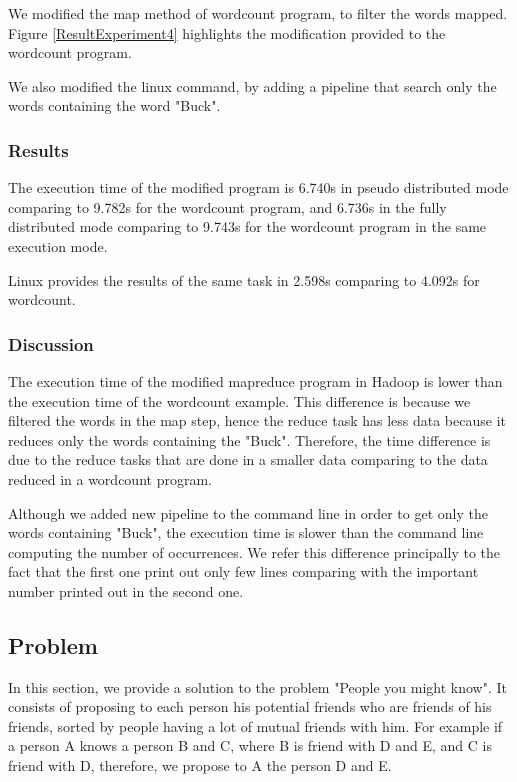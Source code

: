 \documentclass[10pt, conference]{IEEEtran}
\begin{document}
We modified the map method of wordcount program, to filter the words mapped. Figure \ref{ResultExperiment4} highlights the modification provided to the wordcount program.

We also modified the linux command, by adding a pipeline that search only the words containing the word "Buck".

\subsubsection{Results}
The execution time of the modified program is 6.740s in pseudo distributed mode comparing to 9.782s for the wordcount program, and 6.736s in the fully distributed mode comparing to 9.743s for the wordcount program in the same execution mode. 

Linux provides the results of the same task in 2.598s comparing to 4.092s for wordcount. 

\subsubsection{Discussion}

The execution time of the modified mapreduce program in Hadoop is lower than the execution time of the wordcount example. This difference is because we filtered the words in the map step, hence the reduce task has less data because it reduces only the words containing the "Buck". Therefore, the time difference is due to the reduce tasks that are done in a smaller data comparing to the data reduced in a wordcount program.

Although we added new pipeline to the command line in order to get only the words containing "Buck", the execution time is slower than the command line computing the number of occurrences. We refer this difference principally to the fact that the first one print out only few lines comparing with the important number printed out in the second one.


\subsection{Problem}
In this section, we provide a solution to the problem "People you might know". It consists of proposing to each person his potential friends who are friends of his friends, sorted by people having a lot of mutual friends with him. For example if a person A knows a person B and C, where B is friend with D and E, and C is friend with D, therefore, we propose to A the person D and E.
\end{document}
